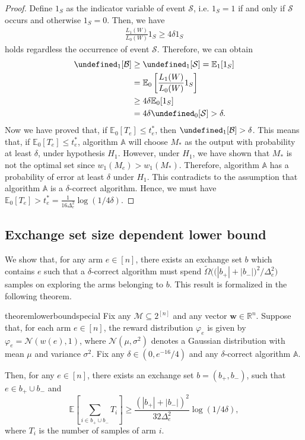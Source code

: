\documentclass{article}
\newcommand{\Rew}{\varphi}
\newcommand{\E}{\mathbb E}
\newcommand{\M}{\mathcal M}
\newcommand{\RR}{\mathbb R}
\newcommand{\Bopt}{\mathcal B_{\mathsf{opt}}}
\let\Pr\undefined
\DeclareMathOperator{\Pr}{Pr}
\renewcommand{\vec}[1]{\boldsymbol{#1}}
\begin{document}
\begin{proof}
Define $1_S$ as the indicator variable of event $\mathcal S$, i.e. $1_S = 1$ if and only if $\mathcal S$ occurs and otherwise $1_S = 0$.
Then, we have
\begin{align*}
\frac{L_1(W)}{L_0(W)} 1_S \ge 4\delta 1_S
\end{align*}
holds regardless the occurrence of event $\mathcal S$.
Therefore, we can obtain
\begin{align*}
\Pr_1[\mathcal B] &\ge \Pr_1[\mathcal S] = \E_1[1_S] \\
				  &= \E_0\left[\frac{L_1(W)}{L_0(W)} 1_S\right] \\
				  &\ge 4\delta \E_0[1_S] \\
				  &= 4\delta \Pr_0[\mathcal S] > \delta.
\end{align*}
Now we have proved that, if $\E_0[T_e] \le t_e^*$, then $\Pr_1[\mathcal B]>\delta$.
This means that, if $\E_0[T_e] \le t_e^*$, algorithm $\mathbb A$ will choose $M_*$ as the output with probability at least $\delta$, under hypothesis $H_1$.
However, under $H_1$, we have shown that $M_*$ is not the optimal set since $w_1(M_e) > w_1(M_*)$.
Therefore, algorithm $\mathbb A$ has a probability of error at least $\delta$ under $H_1$. 
This contradicts to the assumption that algorithm $\mathbb A$ is a $\delta$-correct algorithm.
Hence, we must have $\E_0[T_e] > t_e^* = \frac{1}{16\Delta_e^2}\log(1/4\delta)$.
\end{proof}


\subsection{Exchange set size dependent lower bound}
\label{section:lowerbound-evidence}
We show that, for any arm $e\in [n]$, there exists an exchange set $b$ which contains $e$ such that a $\delta$-correct algorithm must spend
$\tilde \Omega\Big(\big(|b_+|+|b_-|\big)^2 / \Delta_e^2 \Big)$ samples on exploring the arms belonging to $b$.
This result is formalized in the following theorem.

\begin{restatable}{theorem}{lowerboundspecial}
Fix any $\M\subseteq 2^{[n]}$ and any vector $\vec w \in \RR^n$.
Suppose that, for each arm $e\in [n]$, the reward distribution $\Rew_e$ is given by $\Rew_e=\mathcal N(w(e),1)$, where $\mathcal N(\mu, \sigma^2)$ denotes a Gaussian distribution with mean $\mu$ and variance $\sigma^2$. 
Fix any $\delta \in (0,e^{-16}/4)$
and any $\delta$-correct algorithm $\mathbb A$.

Then, for any $e\in [n]$, there exists an exchange set $b=(b_+,b_-)$, such that $e\in b_+ \cup b_-$ and
$$
\E\left[\sum_{i\in b_+\cup b_-} T_i\right] \ge \frac{(|b_+|+|b_-|)^2}{32\Delta_e^2}\log(1/4\delta),
$$
where $T_i$ is the number of samples of arm $i$.
\end{restatable}
\end{document}
